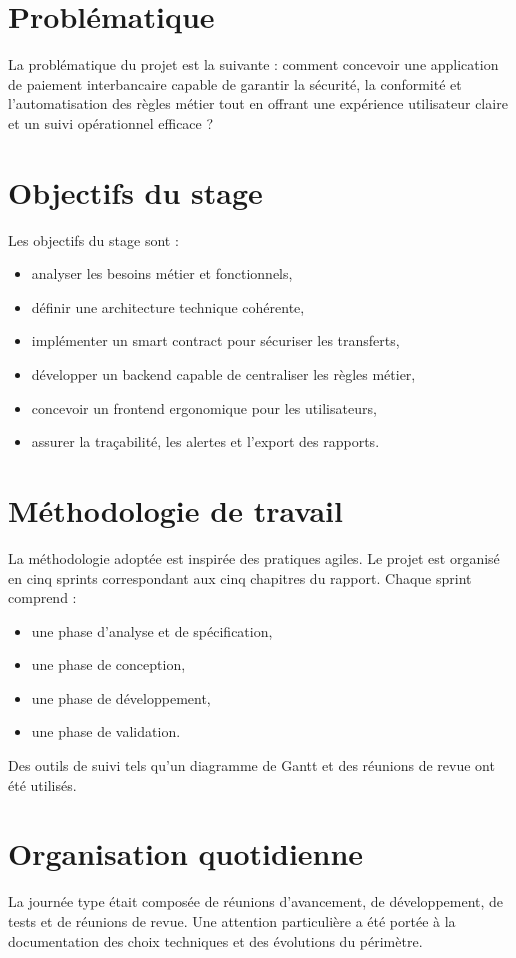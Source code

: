 \documentclass[a4paper,12pt]{report}
\begin{document}
\section{Problématique}
La problématique du projet est la suivante : comment concevoir une application de paiement interbancaire capable de garantir la sécurité, la conformité et l'automatisation des règles métier tout en offrant une expérience utilisateur claire et un suivi opérationnel efficace ?

\section{Objectifs du stage}
Les objectifs du stage sont :
\begin{itemize}[leftmargin=*,nosep]
  \item analyser les besoins métier et fonctionnels,
  \item définir une architecture technique cohérente,
  \item implémenter un smart contract pour sécuriser les transferts,
  \item développer un backend capable de centraliser les règles métier,
  \item concevoir un frontend ergonomique pour les utilisateurs,
  \item assurer la traçabilité, les alertes et l'export des rapports.
\end{itemize}

\section{Méthodologie de travail}
La méthodologie adoptée est inspirée des pratiques agiles. Le projet est organisé en cinq sprints correspondant aux cinq chapitres du rapport. Chaque sprint comprend :
\begin{itemize}[leftmargin=*,nosep]
  \item une phase d'analyse et de spécification,
  \item une phase de conception,
  \item une phase de développement,
  \item une phase de validation.
\end{itemize}
Des outils de suivi tels qu'un diagramme de Gantt et des réunions de revue ont été utilisés.

\section{Organisation quotidienne}
La journée type était composée de réunions d'avancement, de développement, de tests et de réunions de revue. Une attention particulière a été portée à la documentation des choix techniques et des évolutions du périmètre.
\end{document}
